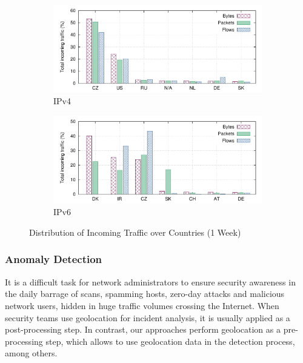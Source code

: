 \begin{figure}[!tb]
    \centering
    \begin{subfigure}[t]{\textwidth}
        \includegraphics[width=\textwidth]{figures/paper-geolocation/ipv4-ctry-breakdown/ipv4-ctry-breakdown-in}
        \caption{IPv4}
        \label{fig:geo-ipv4-traffic}
    \end{subfigure}%
    \hfill
    \begin{subfigure}[t]{\textwidth}
        \includegraphics[width=\textwidth]{figures/paper-geolocation/ipv6-ctry-breakdown/ipv6-ctry-breakdown-in}
        \caption{IPv6}
        \label{fig:geo-ipv6-traffic}
    \end{subfigure}
    \caption{Distribution of Incoming Traffic over Countries (1 Week)}
    \label{fig:geo-ip_ctry_breakdown}
\end{figure}

\subsubsection{Anomaly Detection}

It is a difficult task for network administrators to ensure security awareness in the daily barrage of scans, spamming hosts, zero-day attacks and malicious network users, hidden in huge traffic volumes crossing the Internet. When security teams use geolocation for incident analysis, it is usually applied as a post-processing step. In contrast, our approaches perform geolocation as a pre-processing step, which allows to use geolocation data in the detection process, among others.

